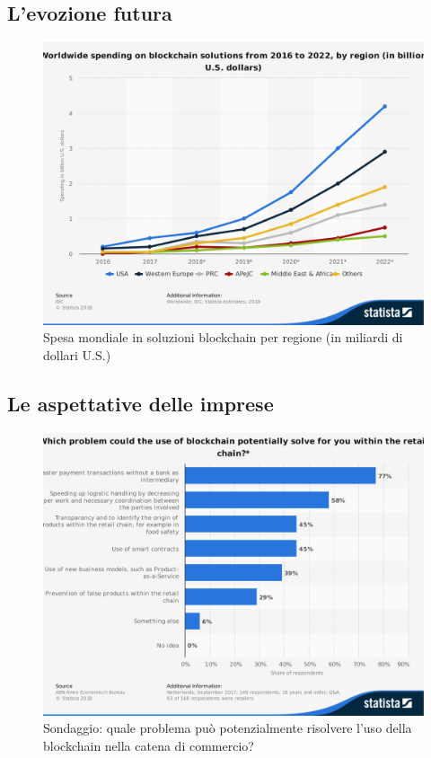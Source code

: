 \subsection{L'evozione futura}
\begin{figure}[H]
	\centering
	\includegraphics[width=.75\linewidth]{images/chap_intro/global-blockchain-solutions-spending.pdf}
	\caption{Spesa mondiale in soluzioni blockchain per regione (in miliardi di
		dollari U.S.) \cite{global-blockchain-solutions-spending}}
\end{figure}

\subsection{Le aspettative delle imprese}
\begin{figure}[H]
	\centering
	\includegraphics[width=.75\linewidth]{images/chap_intro/potential-blockchain-applications.pdf}
	\caption{Sondaggio: quale problema può potenzialmente risolvere l'uso della blockchain
		nella catena di commercio? \cite{potential-blockchain-applications}}
\end{figure}